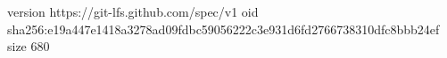 version https://git-lfs.github.com/spec/v1
oid sha256:e19a447e1418a3278ad09fdbc59056222c3e931d6fd2766738310dfc8bbb24ef
size 680
